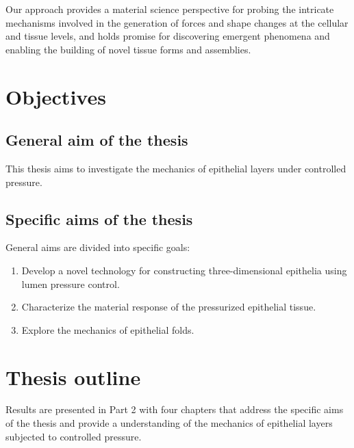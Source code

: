 Our approach provides a material science perspective for probing the intricate mechanisms involved in the generation of forces and shape changes at the cellular and tissue levels, and holds promise for discovering emergent phenomena and enabling the building of novel tissue forms and assemblies.  

\newpage

\hypertarget{objectives}{%
\section{Objectives}\label{objectives}}

\subsection*{General aim of the thesis} 

This thesis aims to investigate the mechanics of epithelial layers under controlled pressure.  

\subsection*{Specific aims of the thesis} 
General aims are divided into specific goals:

\begin{enumerate}
\def\labelenumi{\arabic{enumi}.}
\item  Develop a novel technology for constructing three-dimensional epithelia using lumen pressure control.  
\item  Characterize the material response of the pressurized epithelial tissue.  
\item  Explore the mechanics of epithelial folds.
\end{enumerate}

\hypertarget{thesis-outline}{%
\section{Thesis outline}\label{thesis-outline}}

Results are presented in Part 2 with four chapters that address the specific aims of the thesis and provide a understanding of the mechanics of epithelial layers subjected to controlled pressure.  

